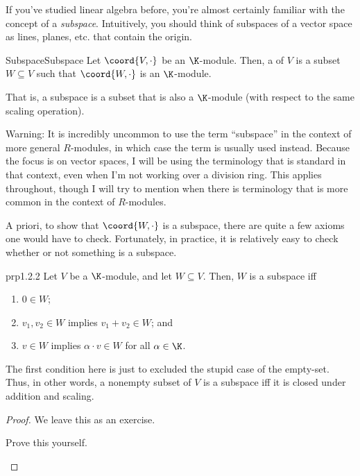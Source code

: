 If you've studied linear algebra before, you're almost certainly familiar with the concept of a \emph{subspace}.  Intuitively, you should think of subspaces of a vector space as lines, planes, etc. that contain the origin.
\begin{dfn}{Subspace}{Subspace}
	Let $\coord{V,\cdot}$ be an $\K$-module.  Then, a  of $V$ is a subset $W\subseteq V$ such that $\coord{W,\cdot}$ is an $\K$-module.
	\begin{rmk}
		That is, a subspace is a subset that is also a $\K$-module (with respect to the same scaling operation).
	\end{rmk}
	\begin{rmk}
		Warning:  It is incredibly uncommon to use the term ``subspace'' in the context of more general $R$-modules, in which case the term  is usually used instead.  Because the focus is on vector spaces, I will be using the terminology that is standard in that context, even when I'm not working over a division ring.  This applies throughout, though I will try to mention when there is terminology that is more common in the context of $R$-modules.
	\end{rmk}
\end{dfn}
A priori, to show that $\coord{W,\cdot}$ is a subspace, there are quite a few axioms one would have to check.  Fortunately, in practice, it is relatively easy to check whether or not something is a subspace.
\begin{prp}{}{prp1.2.2}
	Let $V$ be a $\K$-module, and let $W\subseteq V$.  Then, $W$ is a subspace iff
	\begin{enumerate}
		\item $0\in W$;
		\item $v_1,v_2\in W$ implies $v_1+v_2\in W$; and
		\item $v\in W$ implies $\alpha \cdot v\in W$ for all $\alpha \in \K$.
	\end{enumerate}
	\begin{rmk}
		The first condition here is just to excluded the stupid case of the empty-set.  Thus, in other words, a nonempty subset of $V$ is a subspace iff it is closed under addition and scaling.
	\end{rmk}
	\begin{proof}
		We leave this as an exercise.
		\begin{exr}[breakable=false]{}{}
			Prove this yourself.
		\end{exr}
	\end{proof}
\end{prp}
